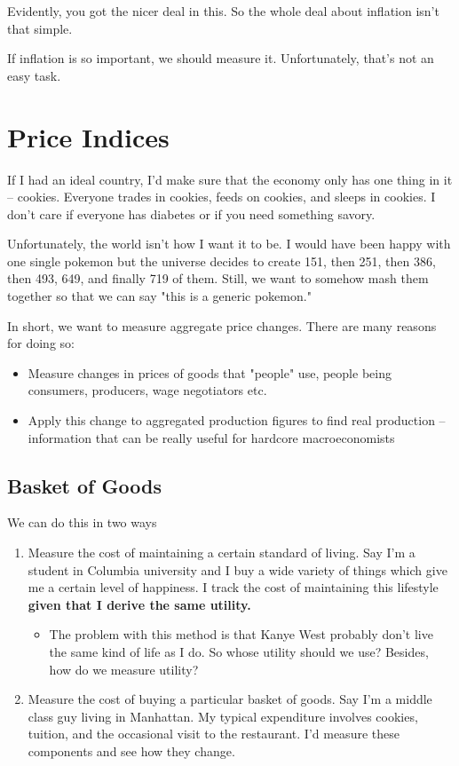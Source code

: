 \documentclass[11pt]{scrartcl}
\begin{document}
Evidently, you got the nicer deal in this. So the whole deal about inflation isn't that simple. 

If inflation is so important, we should measure it. Unfortunately, that's not an easy task. 

\section{Price Indices}

If I had an ideal country, I'd make sure that the economy only has one thing in it -- cookies. Everyone trades in cookies, feeds on cookies, and sleeps in cookies. I don't care if everyone has diabetes or if you need something savory. 

Unfortunately, the world isn't how I want it to be. I would have been happy with one single pokemon but the universe decides to create 151, then 251, then 386, then 493, 649, and finally 719 of them. Still, we want to somehow mash them together so that we can say "this is a generic pokemon."

In short, we want to measure aggregate price changes. There are many reasons for doing so:

\begin{itemize}
\item Measure changes in prices of goods that "people" use, people being consumers, producers, wage negotiators etc.
\item Apply this change to aggregated production figures to find real production -- information that can be really useful for hardcore macroeconomists
\end{itemize}

\subsection{Basket of Goods}

We can do this in two ways

\begin{enumerate}
\item Measure the cost of maintaining a certain standard of living. Say I'm a student in Columbia university and I buy a wide variety of things which give me a certain level of happiness. I track the cost of maintaining this lifestyle \textbf{given that I derive the same utility.}
\begin{itemize}
\item The problem with this method is that Kanye West probably don't live the same kind of life as I do. So whose utility should we use? Besides, how do we measure utility?
\end{itemize}
\item Measure the cost of buying a particular basket of goods. Say I'm a middle class guy living in Manhattan. My typical expenditure involves cookies, tuition, and the occasional visit to the restaurant. I'd measure these components and see how they change.
\end{enumerate}
\end{document}
